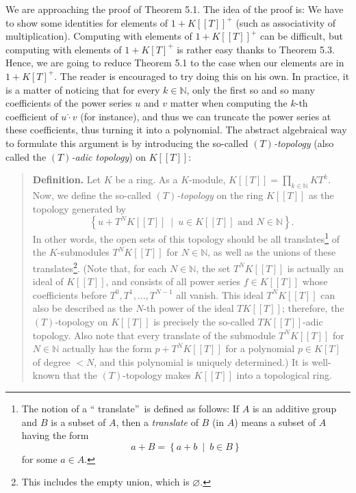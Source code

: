 \documentclass[numbers=enddot,12pt,final,onecolumn,notitlepage]{scrartcl}%
\begin{document}
We are approaching the proof of Theorem 5.1. The idea of the proof is: We have
to show some identities for elements of $1+K\left[  \left[  T\right]  \right]
^{+}$ (such as associativity of multiplication). Computing with elements of
$1+K\left[  \left[  T\right]  \right]  ^{+}$ can be difficult, but computing
with elements of $1+K\left[  T\right]  ^{+}$ is rather easy thanks to Theorem
5.3. Hence, we are going to reduce Theorem 5.1 to the case when our elements
are in $1+K\left[  T\right]  ^{+}$. The reader is encouraged to try doing this
on his own. In practice, it is a matter of noticing that for every
$k\in\mathbb{N}$, only the first so and so many coefficients of the power
series $u$ and $v$ matter when computing the $k$-th coefficient of
$u\widehat{\cdot}v$ (for instance), and thus we can truncate the power series
at these coefficients, thus turning it into a polynomial. The abstract
algebraical way to formulate this argument is by introducing the so-called
$\left(  T\right)  $\textit{-topology} (also called the $\left(  T\right)
$\textit{-adic topology}) on $K\left[  \left[  T\right]  \right]  $:

\begin{quote}
\textbf{Definition.} Let $K$ be a ring. As a $K$-module, $K\left[  \left[
T\right]  \right]  =\prod\limits_{k\in\mathbb{N}}KT^{k}$. Now, we define the
so-called $\left(  T\right)  $\textit{-topology} on the ring $K\left[  \left[
T\right]  \right]  $ as the topology generated by%
\[
\left\{  u+T^{N}K\left[  \left[  T\right]  \right]  \ \mid\ u\in K\left[
\left[  T\right]  \right]  \text{ and }N\in\mathbb{N}\right\}  .
\]
In other words, the open sets of this topology should be all
translates\footnote{The notion of a \textquotedblleft
translate\textquotedblright\ is defined as follows: If $A$ is an additive
group and $B$ is a subset of $A$, then a \textit{translate} of $B$ (in $A$)
means a subset of $A$ having the form%
\[
a+B=\left\{  a+b\ \mid\ b\in B\right\}
\]
for some $a\in A$.} of the $K$-submodules $T^{N}K\left[  \left[  T\right]
\right]  $ for $N\in\mathbb{N}$, as well as the unions of these
translates\footnote{This includes the empty union, which is $\varnothing$.}.
(Note that, for each $N\in\mathbb{N}$, the set $T^{N}K\left[  \left[
T\right]  \right]  $ is actually an ideal of $K\left[  \left[  T\right]
\right]  $, and consists of all power series $f\in K\left[  \left[  T\right]
\right]  $ whose coefficients before $T^{0},T^{1},\ldots,T^{N-1}$ all vanish.
This ideal $T^{N}K\left[  \left[  T\right]  \right]  $ can also be described
as the $N$-th power of the ideal $TK\left[  \left[  T\right]  \right]  $;
therefore, the $\left(  T\right)  $-topology on $K\left[  \left[  T\right]
\right]  $ is precisely the so-called $TK\left[  \left[  T\right]  \right]
$-adic topology. Also note that every translate of the submodule
$T^{N}K\left[  \left[  T\right]  \right]  $ for $N\in\mathbb{N}$ actually has
the form $p+T^{N}K\left[  \left[  T\right]  \right]  $ for a polynomial $p\in
K\left[  T\right]  $ of degree $<N$, and this polynomial is uniquely
determined.) It is well-known that the $\left(  T\right)  $-topology makes
$K\left[  \left[  T\right]  \right]  $ into a topological ring.
\end{quote}
\end{document}
